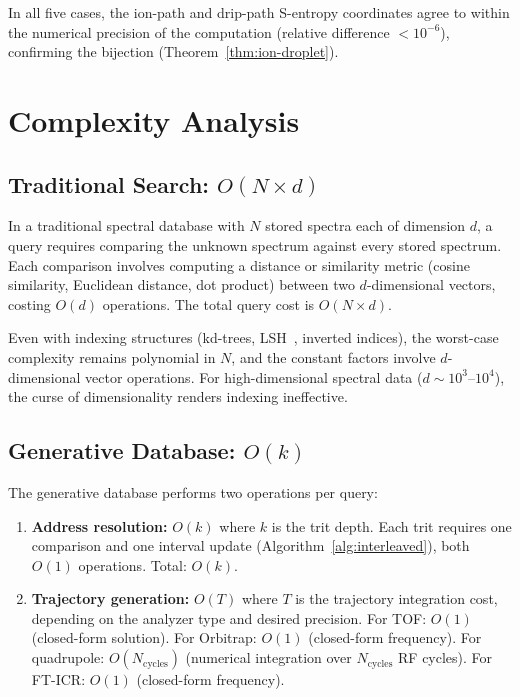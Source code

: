 \documentclass[11pt,twocolumn,a4paper]{article}
\theoremstyle{definition}
\theoremstyle{remark}
\begin{document}
In all five cases, the ion-path and drip-path S-entropy coordinates agree to within the numerical precision of the computation (relative difference $< 10^{-6}$), confirming the bijection (Theorem~\ref{thm:ion-droplet}).

\section{Complexity Analysis}
\label{sec:complexity}

\subsection{Traditional Search: $O(N \times d)$}
\label{sec:traditional-complexity}

In a traditional spectral database with $N$ stored spectra each of dimension $d$, a query requires comparing the unknown spectrum against every stored spectrum. Each comparison involves computing a distance or similarity metric (cosine similarity, Euclidean distance, dot product) between two $d$-dimensional vectors, costing $O(d)$ operations. The total query cost is $O(N \times d)$.

Even with indexing structures (kd-trees, LSH~\citep{indyk1998}, inverted indices), the worst-case complexity remains polynomial in $N$, and the constant factors involve $d$-dimensional vector operations. For high-dimensional spectral data ($d \sim 10^3$--$10^4$), the curse of dimensionality renders indexing ineffective.

\subsection{Generative Database: $O(k)$}
\label{sec:generative-complexity}

The generative database performs two operations per query:
\begin{enumerate}
  \item \textbf{Address resolution:} $O(k)$ where $k$ is the trit depth. Each trit requires one comparison and one interval update (Algorithm~\ref{alg:interleaved}), both $O(1)$ operations. Total: $O(k)$.
  \item \textbf{Trajectory generation:} $O(T)$ where $T$ is the trajectory integration cost, depending on the analyzer type and desired precision. For TOF: $O(1)$ (closed-form solution). For Orbitrap: $O(1)$ (closed-form frequency). For quadrupole: $O(N_{\mathrm{cycles}})$ (numerical integration over $N_{\mathrm{cycles}}$ RF cycles). For FT-ICR: $O(1)$ (closed-form frequency).
\end{enumerate}
\end{document}
